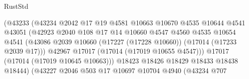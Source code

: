 \begin{lexlean}{RustStd}
\begin{coremodule}
                                          (@43233
                                            (@43234
                                              @2042
                                              @17
                                              @19
                                              @4581
                                              @10663
                                              @10670
                                              @4535
                                              @10644
                                              @4541
                                              @43051
                                              (@42923
                                                @2040
                                                @108
                                                @17
                                                @14
                                                @10660
                                                @4547
                                                @4560
                                                @4535
                                                @10654
                                                @4541
                                                (@43086
                                                  @2039
                                                  @10660
                                                  (@17227 (@17228 @10660))
                                                  (@17014 (@17233 @2039 @17)))
                                                @42967
                                                @17017
                                                (@17014 (@17019 @10655 @4547)))
                                              @17017
                                              (@17014 (@17019 @10645 @10663)))
                                            @18423
                                            @18426
                                            @18429
                                            @18433
                                            @18438
                                            @18444)
                                          (@43227
                                            @2046
                                            @503
                                            @17
                                            @10697
                                            @10704
                                            @4940
                                            (@43234
                                              @707

\end{coremodule}
\end{lexlean}
